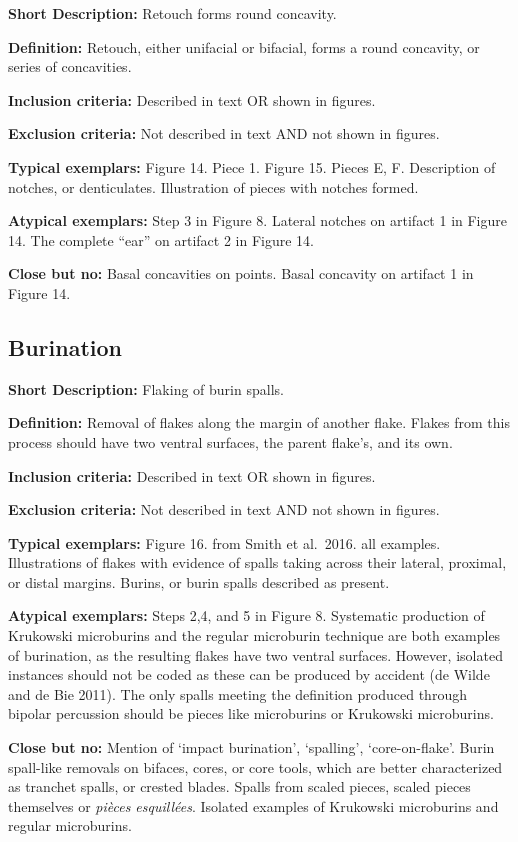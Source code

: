 \documentclass[
]{article}
\begin{document}
\textbf{Short Description:} Retouch forms round concavity.

\textbf{Definition:} Retouch, either unifacial or bifacial, forms a
round concavity, or series of concavities.

\textbf{Inclusion criteria:} Described in text OR shown in figures.

\textbf{Exclusion criteria:} Not described in text AND not shown in
figures.

\textbf{Typical exemplars:} Figure 14. Piece 1. Figure 15. Pieces E, F.
Description of notches, or denticulates. Illustration of pieces with
notches formed.

\textbf{Atypical exemplars:} Step 3 in Figure 8. Lateral notches on
artifact 1 in Figure 14. The complete ``ear'' on artifact 2 in Figure
14.

\textbf{Close but no:} Basal concavities on points. Basal concavity on
artifact 1 in Figure 14.

\hypertarget{burination}{%
\subsection{Burination}\label{burination}}

\textbf{Short Description:} Flaking of burin spalls.

\textbf{Definition:} Removal of flakes along the margin of another
flake. Flakes from this process should have two ventral surfaces, the
parent flake's, and its own.

\textbf{Inclusion criteria:} Described in text OR shown in figures.

\textbf{Exclusion criteria:} Not described in text AND not shown in
figures.

\textbf{Typical exemplars:} Figure 16. from Smith et al.~2016. all
examples. Illustrations of flakes with evidence of spalls taking across
their lateral, proximal, or distal margins. Burins, or burin spalls
described as present.

\textbf{Atypical exemplars:} Steps 2,4, and 5 in Figure 8. Systematic
production of Krukowski microburins and the regular microburin technique
are both examples of burination, as the resulting flakes have two
ventral surfaces. However, isolated instances should not be coded as
these can be produced by accident (de Wilde and de Bie 2011). The only
spalls meeting the definition produced through bipolar percussion should
be pieces like microburins or Krukowski microburins.

\textbf{Close but no:} Mention of `impact burination', `spalling',
`core-on-flake'. Burin spall-like removals on bifaces, cores, or core
tools, which are better characterized as tranchet spalls, or crested
blades. Spalls from scaled pieces, scaled pieces themselves or
\emph{pièces esquillées}. Isolated examples of Krukowski microburins and
regular microburins.
\end{document}
